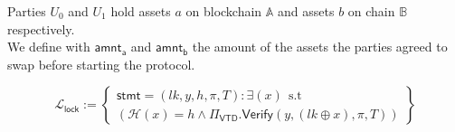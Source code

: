 \documentclass{article}      	%
\begin{document}
Parties $U_0$ and $U_1$ hold assets $a$ on blockchain $\mathbb{A}$ and assets $b$ on chain $\mathbb{B}$ respectively. \\
We define with $\mathsf{amnt_a}$ and $\mathsf{amnt_b}$ the amount of the assets the parties agreed to swap before starting the protocol.

\[
    \mathcal{L}_{\mathsf{lock}} := \left\{\begin{array}{lr}  \mathsf{stmt} = (lk, y, h, \pi, T) : \exists (x) \:\: \text{s.t} \\
    (\mathcal{H}(x) = h \land \Pi_\mathsf{VTD}.\mathsf{Verify}(y, (lk \oplus x), \pi, T)) \end{array}\right\}
\]
\end{document}
